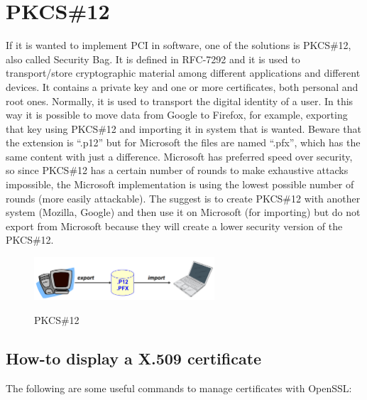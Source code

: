\section{PKCS\#12}
If it is wanted to implement PCI in software, one of the solutions is
PKCS\#12, also called Security Bag. It is defined in RFC-7292 and it
is used to transport/store cryptographic material among different
applications and different devices. It contains a private key and one
or more certificates, both personal and root ones. Normally, it is
used to transport the digital identity of a user. In this way it is
possible to move data from Google to Firefox, for example, exporting
that key using PKCS\#12 and importing it in system that is wanted.
Beware that the extension is “.p12” but for Microsoft the files are
named “.pfx”, which has the same content with just a difference.
Microsoft has preferred speed over security, so since PKCS\#12 has a
certain number of rounds to make exhaustive attacks impossible, the
Microsoft implementation is using the lowest possible number of rounds
(more easily attackable). The suggest is to create PKCS\#12 with
another system (Mozilla, Google) and then use it on Microsoft (for
importing) but do not export from Microsoft because they will create a
lower security version of the PKCS\#12.
\begin{figure}[H]
  \centering
  \includegraphics[width=0.6\textwidth]{img/x509 pkcs12.png}
  \label{fig:PKCS12}

  \caption{PKCS\#12}
\end{figure}


\subsection{How-to display a X.509 certificate}
The following are some useful commands to manage certificates with 
OpenSSL:

